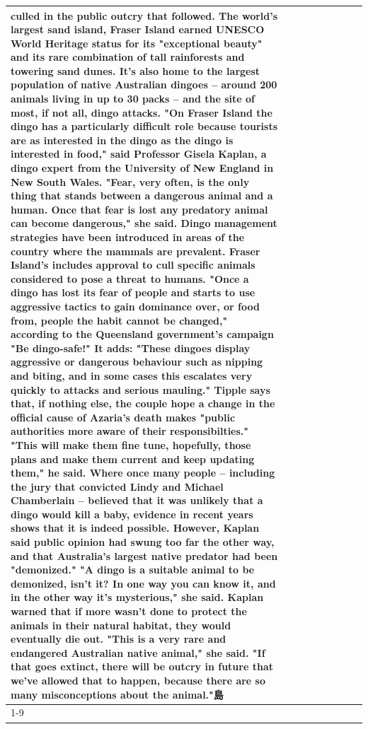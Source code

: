\begin{table}[H]
\begin{tabular}{lllrlllll}
culled in the public outcry that followed. The world's largest sand island, Fraser Island earned UNESCO World Heritage status for its "exceptional beauty" and its rare combination of tall rainforests and towering sand dunes. It's also home to the largest population of native Australian dingoes -- around 200 animals living in up to 30 packs -- and the site of most, if not all, dingo attacks. "On Fraser Island the dingo has a particularly difficult role because tourists are as interested in the dingo as the dingo is interested in food," said Professor Gisela Kaplan, a dingo expert from the University of New England in New South Wales. "Fear, very often, is the only thing that stands between a dangerous animal and a human. Once that fear is lost any predatory animal can become dangerous," she said. Dingo management strategies have been introduced in areas of the country where the mammals are prevalent. Fraser Island's includes approval to cull specific animals considered to pose a threat to humans. "Once a dingo has lost its fear of people and starts to use aggressive tactics to gain dominance over, or food from, people the habit cannot be changed," according to the Queensland government's campaign "Be dingo-safe!" It adds: "These dingoes display aggressive or dangerous behaviour such as nipping and biting, and in some cases this escalates very quickly to attacks and serious mauling." Tipple says that, if nothing else, the couple hope a change in the official cause of Azaria's death makes "public authorities more aware of their responsibilties." "This will make them fine tune, hopefully, those plans and make them current and keep updating them," he said. Where once many people -- including the jury that convicted Lindy and Michael Chamberlain -- believed that it was unlikely that a dingo would kill a baby, evidence in recent years shows that it is indeed possible. However, Kaplan said public opinion had swung too far the other way, and that Australia's largest native predator had been "demonized." "A dingo is a suitable animal to be demonized, isn't it? In one way you can know it, and in the other way it's mysterious," she said. Kaplan warned that if more wasn't done to protect the animals in their natural habitat, they would eventually die out. "This is a very rare and endangered Australian native animal," she said. "If that goes extinct, there will be outcry in future that we've allowed that to happen, because there are so many misconceptions about the animal."島 \\
\cline{1-9}

\end{tabular}
\end{table}
